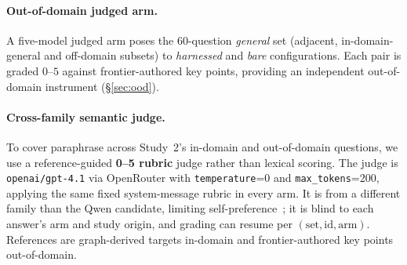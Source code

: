 \documentclass[10pt,twocolumn]{article}
\begin{document}
\paragraph{Out-of-domain judged arm.} A five-model judged arm poses the 60-question \emph{general} set (adjacent, in-domain-general and off-domain subsets) to \emph{harnessed} and \emph{bare} configurations. Each pair is graded $0$--$5$ against frontier-authored key points, providing an independent out-of-domain instrument (\S\ref{sec:ood}).

\paragraph{Cross-family semantic judge.} To cover paraphrase across Study~2's in-domain and out-of-domain questions, we use a reference-guided \textbf{0--5 rubric} judge rather than lexical scoring. The judge is \texttt{openai/gpt-4.1} via OpenRouter with \texttt{temperature}=0 and \texttt{max\_tokens}=200, applying the same fixed system-message rubric in every arm. It is from a different family than the Qwen candidate, limiting self-preference~\cite{zheng2023judging,panickssery2024selfpreference}; it is blind to each answer's arm and study origin, and grading can resume per $(\text{set},\text{id},\text{arm})$. References are graph-derived targets in-domain and frontier-authored key points out-of-domain.
\end{document}
